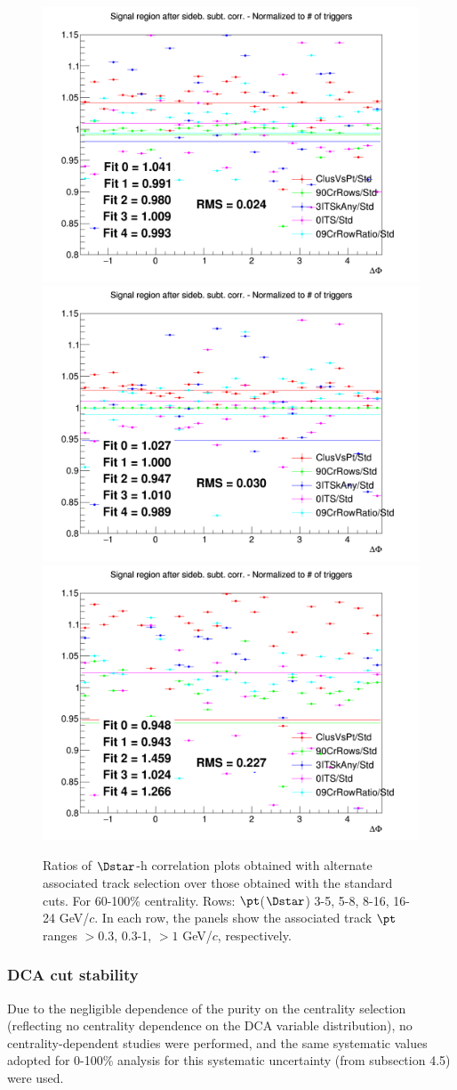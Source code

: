 \begin{figure}
{\includegraphics[width=0.31\linewidth]{figuresVsCent/Dstar/SystTrackEff/AssTrackSyst_60100/Ratio_AzimCorrDistr_Dstar_Canvas_PtIntBins10to10_PoolInt_thr03to99_ASS_60100.png}}
{\includegraphics[width=0.31\linewidth]{figuresVsCent/Dstar/SystTrackEff/AssTrackSyst_60100/Ratio_AzimCorrDistr_Dstar_Canvas_PtIntBins10to10_PoolInt_thr03to1_ASS_60100.png}}
{\includegraphics[width=0.31\linewidth]{figuresVsCent/Dstar/SystTrackEff/AssTrackSyst_60100/Ratio_AzimCorrDistr_Dstar_Canvas_PtIntBins10to10_PoolInt_thr1to99_ASS_60100.png}} \\


 \caption{Ratios of $\Dstar$-h correlation plots obtained with alternate associated track selection over those obtained with the standard cuts. For 60-100\% centrality. Rows: $\pt$($\Dstar$) 3-5, 5-8, 8-16, 16-24 GeV/$c$. In each row, the panels show the associated track
$\pt$ ranges $> 0.3$, 0.3-1, $> 1$ GeV/$c$, respectively.}
\label{fig:SysTrEff60100_Dstar}
\end{figure}


\subsubsection{DCA cut stability}
Due to the negligible dependence of the purity on the centrality selection (reflecting no centrality dependence on the DCA variable  distribution), no centrality-dependent studies were performed, and the same systematic values adopted for 0-100\% analysis for this systematic uncertainty (from subsection 4.5) were used.

